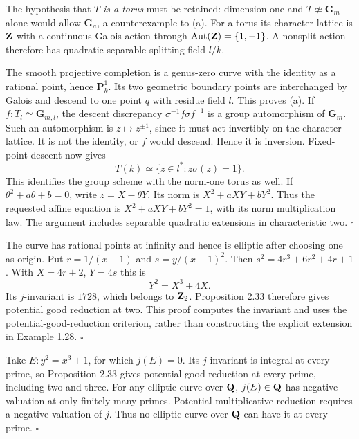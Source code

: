 \documentclass[11pt]{article}
\let\chapterexercise\exercise
\renewcommand{\exercise}[2]{\Needspace{8\baselineskip}\chapterexercise{#1}{#2}}
\begin{document}
\pf The hypothesis that $T$ \emph{is a torus} must be retained: dimension one and $T\not\simeq\mathbf G_m$ alone would allow $\mathbf G_a$, a counterexample to (a). For a torus its character lattice is $\mathbf Z$ with a continuous Galois action through $\operatorname{Aut}(\mathbf Z)=\{1,-1\}$. A nonsplit action therefore has quadratic separable splitting field $l/k$.

The smooth projective completion is a genus-zero curve with the identity as a rational point, hence $\mathbf P^1_k$. Its two geometric boundary points are interchanged by Galois and descend to one point $q$ with residue field $l$. This proves (a). If $f:T_l\simeq\mathbf G_{m,l}$, the descent discrepancy $\sigma^{-1}f\sigma f^{-1}$ is a group automorphism of $\mathbf G_m$. Such an automorphism is $z\mapsto z^{\pm1}$, since it must act invertibly on the character lattice. It is not the identity, or $f$ would descend. Hence it is inversion. Fixed-point descent now gives
\[ T(k)\simeq\{z\in l^*:z\sigma(z)=1\}. \]
This identifies the group scheme with the norm-one torus as well. If $\theta^2+a\theta+b=0$, write $z=X-\theta Y$. Its norm is $X^2+aXY+bY^2$. Thus the requested affine equation is $X^2+aXY+bY^2=1$, with its norm multiplication law. The argument includes separable quadratic extensions in characteristic two. \hfill$\square$

\pf The curve has rational points at infinity and hence is elliptic after choosing one as origin. Put $r=1/(x-1)$ and $s=y/(x-1)^2$. Then $s^2=4r^3+6r^2+4r+1$. With $X=4r+2$, $Y=4s$ this is
\[ Y^2=X^3+4X. \]
Its $j$-invariant is $1728$, which belongs to $\mathbf Z_2$. Proposition 2.33 therefore gives potential good reduction at two. This proof computes the invariant and uses the potential-good-reduction criterion, rather than constructing the explicit extension in Example 1.28. \hfill$\square$

\pf Take $E:y^2=x^3+1$, for which $j(E)=0$. Its $j$-invariant is integral at every prime, so Proposition 2.33 gives potential good reduction at every prime, including two and three. For any elliptic curve over $\mathbf Q$, $j(E)\in\mathbf Q$ has negative valuation at only finitely many primes. Potential multiplicative reduction requires a negative valuation of $j$. Thus no elliptic curve over $\mathbf Q$ can have it at every prime. \hfill$\square$
\end{document}
